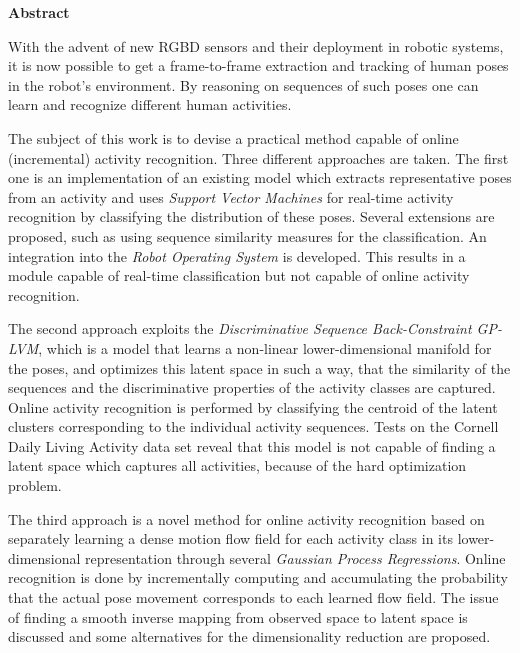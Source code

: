 

\cleardoublepage




\vspace*{2cm}
\begin{center}
{\Large \bf Abstract}
\end{center}
\vspace{1cm}

With the advent of new RGBD sensors and their deployment in robotic systems, it is now possible to get a frame-to-frame extraction and tracking of human poses in the robot's environment. By reasoning on sequences of such poses one can learn and recognize different human activities. 

The subject of this work is to devise a practical method capable of online (incremental) activity recognition. Three different approaches are taken. 
The first one is an implementation of an existing model which extracts representative poses from 
an activity and uses \textit{Support Vector Machines} for real-time activity recognition by classifying the distribution of these poses. Several extensions are proposed, such as using sequence similarity measures for the classification. An integration into the \textit{Robot Operating System} is developed. This results in a module capable of real-time classification but not capable of online activity recognition.

The second approach exploits the \textit{Discriminative Sequence Back-Constraint GP-LVM}, which is a model that learns a non-linear lower-dimensional manifold for the poses, and optimizes this latent space in such a way, that the similarity of the sequences and the discriminative properties of the activity classes are captured. Online activity recognition is performed by classifying the centroid of the latent clusters corresponding to the individual activity sequences. Tests on the Cornell Daily Living Activity data set reveal that this model is not capable of finding a latent space which captures all activities, because of the hard optimization problem. 

The third approach is a novel method for online activity recognition based on separately learning a dense motion flow field for each activity class in its lower-dimensional representation through several \textit{Gaussian Process Regressions}. Online recognition is done by incrementally computing and accumulating the probability that the actual pose movement corresponds to each learned flow field. The issue of finding a smooth inverse mapping from observed space to latent space is discussed and some alternatives for the dimensionality reduction are proposed.
